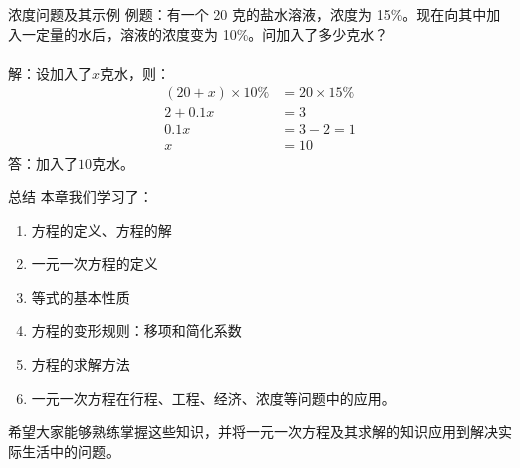 \documentclass{ctexbeamer}
\begin{document}
\begin{frame}[t]{浓度问题及其示例}
例题：有一个 20 克的盐水溶液，浓度为 15\%。现在向其中加入一定量的水后，溶液的浓度变为 10\%。问加入了多少克水？\\
\\
解：设加入了$x$克水，则：\\
\pause
\begin{align}
(20 + x) \times 10 \% &= 20 \times 15 \% \\
2 + 0.1x &= 3 \\
0.1x &= 3 - 2 = 1 \\
x &= 10
\end{align}
答：加入了$10$克水。
\end{frame}

\begin{frame}[t]{总结}
本章我们学习了：
\begin{enumerate}[label={\arabic*.}]
\item 方程的定义、方程的解
\item 一元一次方程的定义
\item 等式的基本性质
\item 方程的变形规则：移项和简化系数
\item 方程的求解方法
\item 一元一次方程在行程、工程、经济、浓度等问题中的应用。
\end{enumerate}
希望大家能够熟练掌握这些知识，并将\alert{一元一次方程及其求解的知识}应用到解决实际生活中的问题。
\end{frame}
\end{document}
